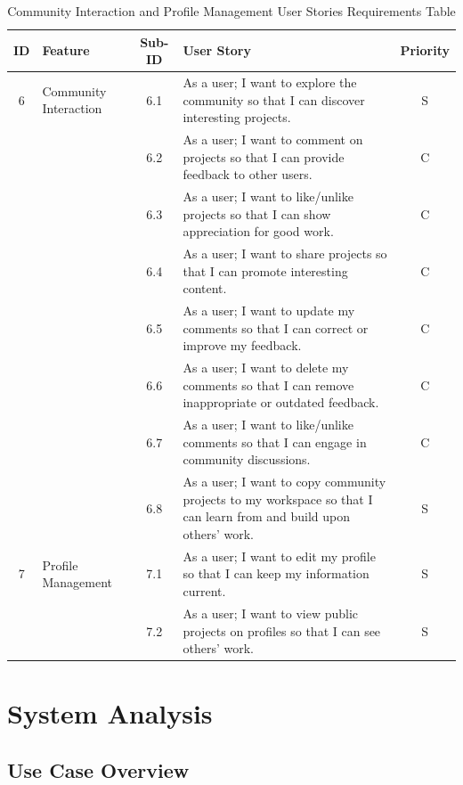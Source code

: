 \begin{table}[h]
    \centering
    \begin{tabular}{|c|l|c|p{8cm}|c|}
    \hline
    \textbf{ID} & \textbf{Feature} & \textbf{Sub-ID} & \textbf{User Story} & \textbf{Priority} \\
    \hline
    6 & Community Interaction & 6.1 & As a user; I want to explore the community so that I can discover interesting projects. & S \\
    \hline
      &  & 6.2 & As a user; I want to comment on projects so that I can provide feedback to other users. & C \\
    \hline
      &  & 6.3 & As a user; I want to like/unlike projects so that I can show appreciation for good work. & C \\
    \hline
      &  & 6.4 & As a user; I want to share projects so that I can promote interesting content. & C \\
    \hline
      &  & 6.5 & As a user; I want to update my comments so that I can correct or improve my feedback. & C \\
    \hline
      &  & 6.6 & As a user; I want to delete my comments so that I can remove inappropriate or outdated feedback. & C \\
    \hline
      &  & 6.7 & As a user; I want to like/unlike comments so that I can engage in community discussions. & C \\
    \hline
      &  & 6.8 & As a user; I want to copy community projects to my workspace so that I can learn from and build upon others' work. & S \\
    \hline
    7 & Profile Management & 7.1 & As a user; I want to edit my profile so that I can keep my information current. & S \\
    \hline
      &  & 7.2 & As a user; I want to view public projects on profiles so that I can see others' work. & S \\
    \hline
    \end{tabular}
    \caption{Community Interaction and Profile Management User Stories Requirements Table}
    \label{tab:community_profile}
    \end{table}
\section{System Analysis}

\subsection{Use Case Overview}

